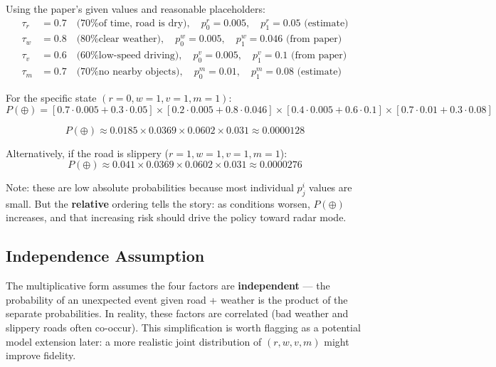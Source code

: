 \documentclass[12pt,a4paper]{article}
\begin{document}
Using the paper's given values and reasonable placeholders:
\begin{align*}
    \tau_r &= 0.7 \quad \text{(70\% of time, road is dry)}, \quad p^r_0 = 0.005, \quad p^r_1 = 0.05 \text{ (estimate)} \\
    \tau_w &= 0.8 \quad \text{(80\% clear weather)}, \quad p^w_0 = 0.005, \quad p^w_1 = 0.046 \text{ (from paper)} \\
    \tau_v &= 0.6 \quad \text{(60\% low-speed driving)}, \quad p^v_0 = 0.005, \quad p^v_1 = 0.1 \text{ (from paper)} \\
    \tau_m &= 0.7 \quad \text{(70\% no nearby objects)}, \quad p^m_0 = 0.01, \quad p^m_1 = 0.08 \text{ (estimate)}
\end{align*}

For the specific state $(r=0, w=1, v=1, m=1)$:
\begin{equation}
P(\oplus) = \left[ 0.7 \cdot 0.005 + 0.3 \cdot 0.05 \right]
            \times \left[ 0.2 \cdot 0.005 + 0.8 \cdot 0.046 \right]
            \times \left[ 0.4 \cdot 0.005 + 0.6 \cdot 0.1 \right]
            \times \left[ 0.7 \cdot 0.01 + 0.3 \cdot 0.08 \right]
\end{equation}

\begin{equation}
P(\oplus) \approx 0.0185 \times 0.0369 \times 0.0602 \times 0.031 \approx 0.0000128
\end{equation}

Alternatively, if the road is slippery ($r=1, w=1, v=1, m=1$):
\begin{equation}
P(\oplus) \approx 0.041 \times 0.0369 \times 0.0602 \times 0.031 \approx 0.0000276
\end{equation}

Note: these are low absolute probabilities because most individual $p^i_j$ values are small. But the \textbf{relative} ordering tells the story: as conditions worsen, $P(\oplus)$ increases, and that increasing risk should drive the policy toward radar mode.

\subsection{Independence Assumption}

The multiplicative form assumes the four factors are \textbf{independent} --- the probability of an unexpected event given road + weather is the product of the separate probabilities. In reality, these factors are correlated (bad weather and slippery roads often co-occur). This simplification is worth flagging as a potential model extension later: a more realistic joint distribution of $(r, w, v, m)$ might improve fidelity.
\end{document}
